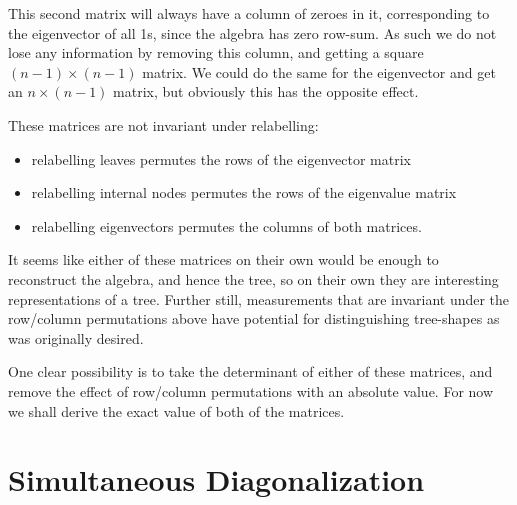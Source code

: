 \documentclass{report}
\begin{document}
This second matrix will always have a column of zeroes in it, corresponding to
the eigenvector of all 1s, since the algebra has zero row-sum.
As such we do not lose any information by removing this column, and getting a
square $(n-1) \times (n-1)$ matrix.
We could do the same for the eigenvector and get an $n \times (n-1)$ matrix,
but obviously this has the opposite effect.

These matrices are not invariant under relabelling:
\begin{itemize}
	\item relabelling leaves permutes the rows of the eigenvector matrix
	\item relabelling internal nodes permutes the rows of the eigenvalue matrix
	\item relabelling eigenvectors permutes the columns of both matrices.
\end{itemize}

It seems like either of these matrices on their own would be enough to
reconstruct the algebra, and hence the tree, so on their own they are
interesting representations of a tree.
Further still, measurements that are invariant under the row/column
permutations above have potential for distinguishing tree-shapes as was
originally desired.

One clear possibility is to take the determinant of either of these matrices,
and remove the effect of row/column permutations with an absolute value.
For now we shall derive the exact value of both of the matrices.


\section{Simultaneous Diagonalization}

%
%
%
%
\end{document}
